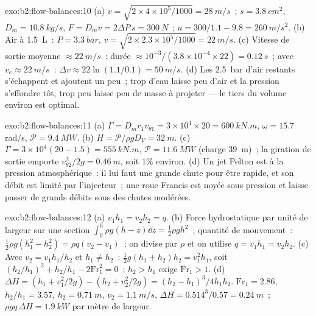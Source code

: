 \begin{solution}{exo:b2:flow-balances:10}
(a) $v = \sqrt{2 \times 4 \times 10^5/1000} = \qty{28}{m/s}$~; $s = \qty{3.8}{cm^2}$, $D_m =
\qty{10.8}{kg/s}$, $F = D_mv = 2\Delta P\,s = \qty{300}{N}$~; $a = 300/1.1 - 9.8 =
\qty{260}{m/s^2}$. (b) Air à \qty{1.5}{L}~: $P = \qty{3.3}{bar}$, $v = \sqrt{2 \times 2.3 \times
10^5/1000} = \qty{22}{m/s}$. (c) Vitesse de sortie moyenne $\approx \qty{22}{m/s}$~: durée $\approx 10^{-3}
/(3.8 \times 10^{-4} \times 22) = \qty{0.12}{s}$~;  avec $v_e \approx \qty{22}{m/s}$~:
$\Delta v \approx 22\ln(1.1/0.1) = \qty{50}{m/s}$. (d) Les \qty{2.5}{bar} d'air restants
s'échappent et ajoutent un peu~; trop d'eau laisse peu d'air et la
pression s'effondre tôt, trop peu laisse peu de masse à projeter ---
le tiers du volume environ est optimal.
\end{solution}

\begin{solution}{exo:b2:flow-balances:11}
(a) $\Gamma = D_mr_1v_{\theta1} = 3 \times 10^4 \times 20 = \qty{600}{kN.m}$, $\omega = 15.7$ rad/s,
$\mathcal P = \qty{9.4}{MW}$. (b) $H = \mathcal P/\rho gD_V = \qty{32}{m}$. (c) $\Gamma = 3 \times
10^4(20 - 1.5) = \qty{555}{kN.m}$, $\mathcal P = \qty{11.6}{MW}$ (charge \qty{39}{m})~; la
giration de sortie emporte $v_{\theta2}^2/2g = \qty{0.46}{m}$, soit $1\%$ environ. (d) Un jet Pelton
est à la pression atmosphérique~: il lui faut une grande chute pour être rapide, et son
débit est limité par l'injecteur~; une roue Francis est noyée sous
pression et laisse passer de grands débits sous des chutes modérées.
\end{solution}

\begin{solution}{exo:b2:flow-balances:12}
(a) $v_1h_1 = v_2h_2 = q$. (b) Force hydrostatique par unité de largeur sur une
section $\int_0^h\rho g(h - z)\dd z = \tfrac12\rho gh^2$~; quantité de mouvement~: $\tfrac12\rho g(h_1^2
- h_2^2) = \rho q(v_2 - v_1)$~; on divise par $\rho$ et on utilise $q = v_1h_1 = v_2h_2$.
(c) Avec $v_2 = v_1h_1/h_2$ et $h_1 \ne h_2$~: $\tfrac12g(h_1 + h_2)h_2 = v_1^2h_1$,
soit $(h_2/h_1)^2 + h_2/h_1 - 2\mathrm{Fr}_1^2 = 0$~; $h_2 > h_1$ exige $\mathrm{Fr}_1 > 1$.
(d) $\Delta H = (h_1 + v_1^2/2g) - (h_2 + v_2^2/2g) = (h_2 - h_1)^3/4h_1h_2$.
$\mathrm{Fr}_1 = 2.86$, $h_2/h_1 = 3.57$, $h_2 = \qty{0.71}{m}$, $v_2 = \qty{1.1}{m/s}$,
$\Delta H = 0.514^3/0.57 = \qty{0.24}{m}$~; $\rho gq\,\Delta H = \qty{1.9}{kW}$ par mètre de
largeur.
\end{solution}

